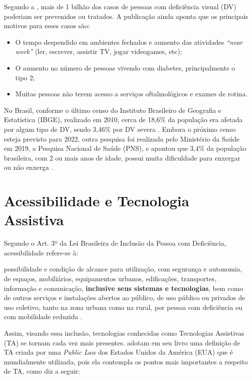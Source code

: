Segundo a , mais de 1 bilhão dos casos de pessoas com deficiência visual (DV) poderiam ser prevenidos ou
tratados. A publicação ainda aponta que os principais motivos para esses casos são:

\begin{itemize}
    \item O tempo despendido em ambientes fechados e aumento das atividades \textit{``near work''} (ler, escrever, assistir TV, jogar videogames, etc);
    \item O aumento no número de pessoas vivendo com diabetes, principalmente o tipo 2;
    \item Muitas pessoas não terem acesso a serviços oftalmológicos e exames de rotina.
\end{itemize}

No Brasil, conforme o último censo do Instituto Brasileiro de Geografia e Estatistica (IBGE), realizado em 2010,
cerca de 18,6\% da população era afetada por algum tipo de DV, sendo 3,46\% por DV severa
\cite{IBGE2012}. Embora o próximo censo esteja previsto para 2022, outra pesquisa
foi realizada pelo Ministério da Saúde em 2019, a Pesquisa Nacional de Saúde (PNS), e apontou que 3,4\% da população brasileira,
com 2 ou mais anos de idade, possui muita dificuldade para enxergar ou não enxerga \cite{stopa2020pesquisa}.

\section{Acessibilidade e Tecnologia Assistiva}

Segundo o Art. 3º da Lei Brasileira de Inclusão da Pessoa com Deficiência,
acessibilidade refere-se à:

\begin{citacao}
    possibilidade e condição de alcance para utilização, com segurança e autonomia, de espaços, mobiliários, equipamentos urbanos,
    edificações, transportes, informação e comunicação, \textbf{inclusive seus sistemas e tecnologias}, bem como de outros serviços e
    instalações abertos ao público, de uso público ou privados de uso coletivo, tanto na zona urbana como na rural, por pessoa com
    deficiência ou com mobilidade reduzida \cite{Brasil2015}.
\end{citacao}

Assim, visando essa inclusão, tecnologias conhecidas como Tecnologias Assistivas (TA) se tornam cada vez mais presentes.
 adotam em seu livro uma definição de TA criada por uma \textit{Public Law}
dos Estados Unidos da América (EUA) que é mundialmente utilizada, pois ela contempla os pontos mais
importantes a respeito de TA, como diz a seguir:

